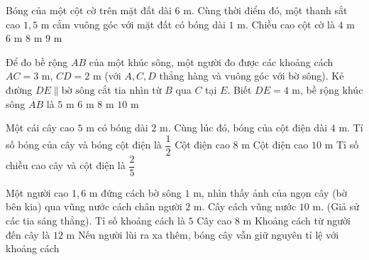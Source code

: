 \begin{ex}%
	Bóng của một cột cờ trên mặt đất dài $6\text{ m}$. Cùng thời điểm đó, một thanh sắt cao $1{,}5\text{ m}$ cắm vuông góc với mặt đất có bóng dài $1\text{ m}$. Chiều cao cột cờ là
	\choice
	{$4\text{ m}$}
	{$6\text{ m}$}
	{$8\text{ m}$}
	{\True $9\text{ m}$}
\end{ex}

\begin{ex}%
	Để đo bề rộng $AB$ của một khúc sông, một người đo được các khoảng cách $AC = 3\text{ m}$, $CD = 2\text{ m}$ (với $A, C, D$ thẳng hàng và vuông góc với bờ sông). Kẻ đường $DE \parallel \text{bờ sông}$ cắt tia nhìn từ $B$ qua $C$ tại $E$. Biết $DE = 4\text{ m}$, bề rộng khúc sông $AB$ là
	\choice
	{$5\text{ m}$}
	{\True $6\text{ m}$}
	{$8\text{ m}$}
	{$10\text{ m}$}
\end{ex}

\begin{ex}%
	Một cái cây cao $5\text{ m}$ có bóng dài $2\text{ m}$. Cùng lúc đó, bóng của cột điện dài $4\text{ m}$.
	\choiceTF
	{\True Tỉ số bóng của cây và bóng cột điện là $\dfrac{1}{2}$}
	{Cột điện cao $8\text{ m}$}
	{\True Cột điện cao $10\text{ m}$}
	{Tỉ số chiều cao cây và cột điện là $\dfrac{2}{5}$}
\end{ex}

\begin{ex}%
	Một người cao $1{,}6\text{ m}$ đứng cách bờ sông $1\text{ m}$, nhìn thấy ảnh của ngọn cây (bờ bên kia) qua vũng nước cách chân người $2\text{ m}$. Cây cách vũng nước $10\text{ m}$. (Giả sử các tia sáng thẳng).
	\choiceTF
	{Tỉ số khoảng cách là $5$}
	{\True Cây cao $8\text{ m}$}
	{Khoảng cách từ người đến cây là $12\text{ m}$}
	{\True Nếu người lùi ra xa thêm, bóng cây vẫn giữ nguyên tỉ lệ với khoảng cách}
\end{ex}

